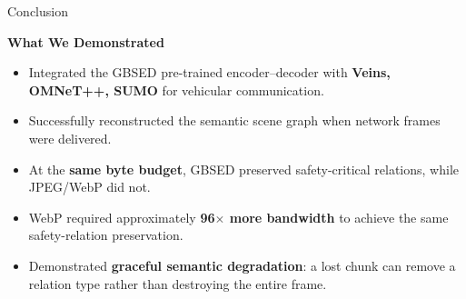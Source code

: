 \documentclass[aspectratio=169]{beamer}
\begin{document}
\begin{frame}{Conclusion}

\small

\begin{center}
\textbf{What We Demonstrated}
\end{center}

\vspace{0.1cm}

\begin{itemize}

    \item Integrated the GBSED pre-trained encoder--decoder with
          \textbf{Veins, OMNeT++, SUMO}
          for vehicular communication.

    \vspace{0.1cm}

    \item Successfully reconstructed the semantic scene graph
          when network frames were delivered.

    \vspace{0.1cm}

    \item At the \textbf{same byte budget}, GBSED preserved
          safety-critical relations, while JPEG/WebP did not.

    \vspace{0.1cm}

    \item WebP required approximately \textbf{96$\times$ more bandwidth}
          to achieve the same safety-relation preservation.

    \vspace{0.1cm}

    \item Demonstrated \textbf{graceful semantic degradation}:
          a lost chunk can remove a relation type rather than
          destroying the entire frame.

\end{itemize}

\end{frame}
\end{document}
